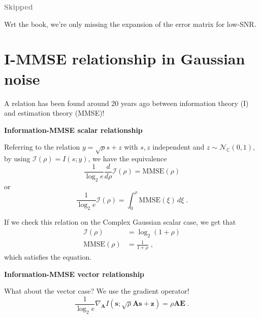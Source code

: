 \documentclass[a4paper, 12pt]{book}
\begin{document}
\begin{tcolorbox}[colframe=gray, colback=gray!10, boxrule=1pt, arc=2pt]
    \textcolor{gray}{\textbf{Skipped}}

    Wrt the book, we're only missing the expansion of the error matrix for low-SNR.
\end{tcolorbox}

\section{I-MMSE relationship in Gaussian noise}

A relation has been found around 20 years ago between information theory (I) and estimation theory (MMSE)!

\begin{tcolorbox}[colframe=cyan!80!blue, colback=white, boxrule=1pt, arc=2pt]
    \textcolor{cyan!80!blue}{\textbf{Information-MMSE scalar relationship}}

    Referring to the relation $y = \sqrt{\rho}s + z$ with $s, z$ independent and $z \sim \mathcal{N}_{\mathbb{C}}(0,1)$, by using $\mathcal{I}(\rho) = I(s; y)$, we have the equivalence
    \begin{equation}
    \frac{1}{\log_2 e} \frac{d}{d\rho} \mathcal{I}(\rho) = \text{MMSE}(\rho) \tag{1.196}
    \end{equation}
    or
    \begin{equation}
    \frac{1}{\log_2 e} \mathcal{I}(\rho) = \int_0^{\rho} \text{MMSE}(\xi) \, d\xi \;. \tag{1.197}
    \end{equation}
\end{tcolorbox}


If we check this relation on the Complex Gaussian scalar case, we get that
\begin{align}
\mathcal{I}(\rho) &= \log_2(1+\rho) \tag{1.198} \\
\text{MMSE}(\rho) &= \frac{1}{1+\rho} \;, \tag{1.199}
\end{align}
which satisfies the equation.

\begin{tcolorbox}[colframe=cyan!80!blue, colback=white, boxrule=1pt, arc=2pt]
    \textcolor{cyan!80!blue}{\textbf{Information-MMSE vector relationship}}

    What about the vector case? We use the gradient operator!
    $$
    \frac{1}{\log_2 e} \nabla_{\bm{A}} I(\bm{s}; \sqrt{\rho}\bm{A}\bm{s} + \bm{z}) = \rho \bm{A} \bm{E} \;.
    $$
\end{tcolorbox}
\end{document}
